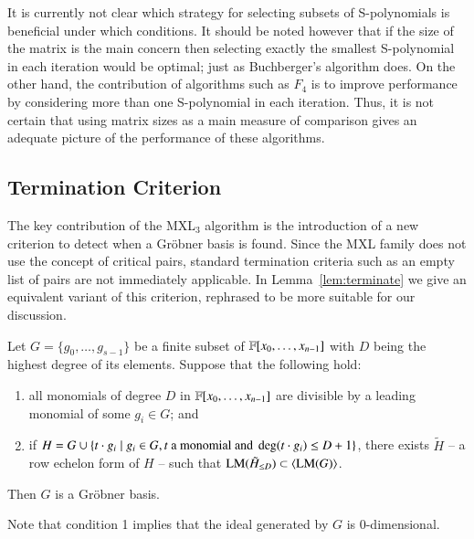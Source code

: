 It is currently not clear which strategy for selecting subsets of S-polynomials is beneficial under which conditions. It should be noted however that if the size of the matrix is the main concern then selecting exactly the smallest S-polynomial in each iteration would be optimal; just as Buchberger's algorithm does. On the other hand, the contribution of algorithms such as $F_4$ is to improve performance by considering more than one S-polynomial in each iteration. Thus, it is not certain that using matrix sizes as a main measure of comparison gives an adequate picture of the performance of these algorithms.

\subsection{Termination Criterion} \label{sec:termination}
The key contribution of the MXL$_3$ algorithm is the introduction of a new criterion to detect when a Gr\"obner basis is found. Since the MXL family does not use the concept of critical pairs, standard termination criteria such as an empty list of pairs are not immediately applicable. In Lemma~\ref{lem:terminate} we give an equivalent variant  of this criterion, rephrased  to be more suitable for our discussion. 
\begin{lemma} \label{lem:terminate}
Let $G=\{g_0,\ldots, g_{s-1}\}$ be a finite subset of ${{{\mathbb F}}[x_0,\ldots,x_{n-1}]}$ with $D$ being the highest degree of its elements. Suppose that the following hold:
\begin{enumerate}
 \item all monomials of degree $D$ in ${{{\mathbb F}}[x_0,\ldots,x_{n-1}]}$ are divisible by a leading monomial of some $g_i \in G$; and
 \item if $H = G \cup \{t \cdot g_i \mid g_i \in G, t \textnormal{ a monomial and } \deg(t \cdot g_i) \leq D + 1\}$, there exists $\tilde{H}$ -- a row echelon form of $H$ -- such that $\textsc{LM}(\tilde{H}_{\leq D}) \subset \langle \textsc{LM}(G)\rangle$.
\end{enumerate}
Then $G$ is a Gr\"obner basis.
\end{lemma}
Note that condition 1 implies that the ideal generated by $G$ is 0-dimensional.

